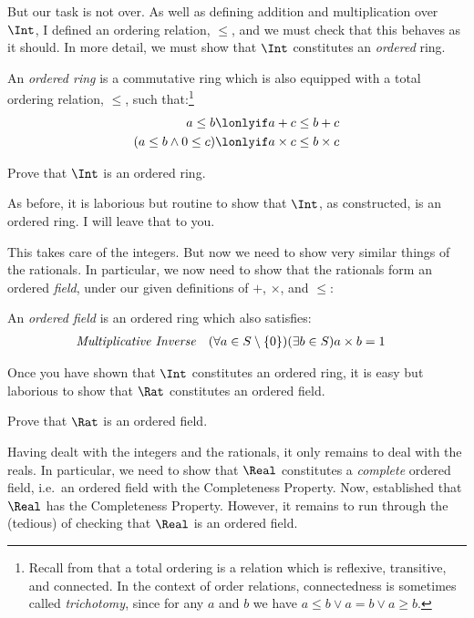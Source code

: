 \documentclass[../../../include/open-logic-section]{subfiles}
\begin{document}
But our task is not over. As well as defining addition and multiplication over $\Int$, I defined an ordering relation, $\leq$, and we must check that this behaves as it should. In more detail, we must show that $\Int$ constitutes an \emph{ordered} ring. 
\begin{defn}An \emph{ordered ring} is a commutative ring which is also equipped with a total ordering relation, $\leq$, such that:\footnote{Recall from  that a total ordering is a relation which is reflexive, transitive, and connected. In the context of order relations, connectedness is sometimes called \emph{trichotomy}, since for any $a$ and $b$ we have $a \leq b \lor a = b \lor a \geq b$.} 
\begin{align*}
	a \leq b &\lonlyif a + c \leq b + c\\
	(a \leq b \land 0 \leq c) &\lonlyif a \times c \leq b \times c
\end{align*}
\end{defn}
\begin{prob}
	Prove that $\Int$ is an ordered ring. 
\end{prob}
\noindent
As before, it is laborious but routine to show that $\Int$, as constructed, is an ordered ring. I will leave that  to you.

This takes care of the integers. But now we need to show very similar things of the rationals. In particular, we now need to show that the rationals form an ordered \emph{field}, under our given definitions of $+$, $\times$, and $\leq$:
\begin{defn}
	An \emph{ordered field} is an ordered ring which also satisfies:
	\begin{align*}
		\emph{Multiplicative Inverse}& & (\forall a \in S \setminus \{0\})(\exists b \in S) a\times b& = 1
	\end{align*}
\end{defn}
\noindent
Once you have shown that $\Int$ constitutes an ordered ring, it is easy but laborious to show that $\Rat$ constitutes an ordered field.
\begin{prob}
	Prove that $\Rat$ is an ordered field.
\end{prob}

Having dealt with the integers and the rationals, it only remains to deal with the reals. In particular, we need to show that $\Real$ constitutes a \emph{complete} ordered field, i.e.\ an ordered field with the Completeness Property. Now,  established that $\Real$ has the Completeness Property. However, it remains to run through the (tedious) of checking that $\Real$ is an ordered field. 
\end{document}
